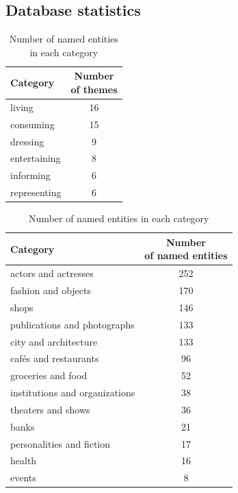 \documentclass[12pt, a4paper, twocolumn]{article}
\begin{document}
\begin{appendices}
    \onecolumn
    \section{Database statistics}
    
    \begin{table}[h]
        \parbox{.45\linewidth}{
            \centering\footnotesize
            \begin{tabular}{ m{.6\linewidth} c }
                \toprule
                Category & \makecell{Number\\of themes}\\
                \midrule
                living & 16\\
                consuming & 15\\
                dressing & 9\\
                entertaining & 8\\
                informing & 6\\
                representing & 6\\
                \bottomrule
            \end{tabular}
            \caption{Number of themes in each category}
            \label{table:theme}
        }
        \parbox{.4\linewidth}{
            \centering\footnotesize
            \begin{tabular}{ m{.6\linewidth} c }
                \toprule
                Category & \makecell{Number\\of named entities}\\
                \midrule
                actors and actresses & 252\\
                fashion and objects & 170\\
                shops & 146\\
                publications and photographs & 133\\
                city and architecture & 133\\
                cafés and restaurants & 96\\
                groceries and food & 52\\
                institutions and organizations & 38\\
                theaters and shows & 36\\
                banks & 21\\
                personalities and fiction & 17\\
                health & 16\\
                events & 8\\
                \bottomrule
            \end{tabular}
            \caption{Number of named entities in each category} 
            \label{table:named_entity}
        }
    \end{table}


\end{appendices}
\end{document}
